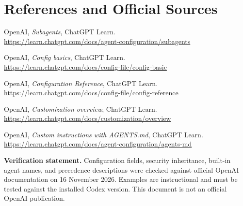 \documentclass[11pt,letterpaper]{article}
\begin{document}
\section*{References and Official Sources}
\begin{enumerate}[label={[\arabic*]},leftmargin=1.1cm,itemsep=8pt]
  \item OpenAI, \emph{Subagents}, ChatGPT Learn.\\\url{https://learn.chatgpt.com/docs/agent-configuration/subagents}
  \item OpenAI, \emph{Config basics}, ChatGPT Learn.\\\url{https://learn.chatgpt.com/docs/config-file/config-basic}
  \item OpenAI, \emph{Configuration Reference}, ChatGPT Learn.\\\url{https://learn.chatgpt.com/docs/config-file/config-reference}
  \item OpenAI, \emph{Customization overview}, ChatGPT Learn.\\\url{https://learn.chatgpt.com/docs/customization/overview}
  \item OpenAI, \emph{Custom instructions with AGENTS.md}, ChatGPT Learn.\\\url{https://learn.chatgpt.com/docs/agent-configuration/agents-md}
\end{enumerate}
\begin{infobox}
\textbf{Verification statement.} Configuration fields, security inheritance, built-in agent names, and precedence descriptions were checked against official OpenAI documentation on 16 November 2026. Examples are instructional and must be tested against the installed Codex version. This document is not an official OpenAI publication.
\end{infobox}
\end{document}
